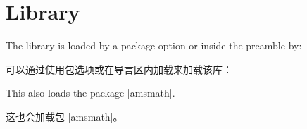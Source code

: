 \setcounter{section}{17}
\section{Library }\label{sec:theorems}%
%
The library is loaded by a package option or inside the preamble by:

可以通过使用包选项或在导言区内加载来加载该库：
\begin{dispListing}
\end{dispListing}
This also loads the package |amsmath|.

这也会加载包 |amsmath|。




